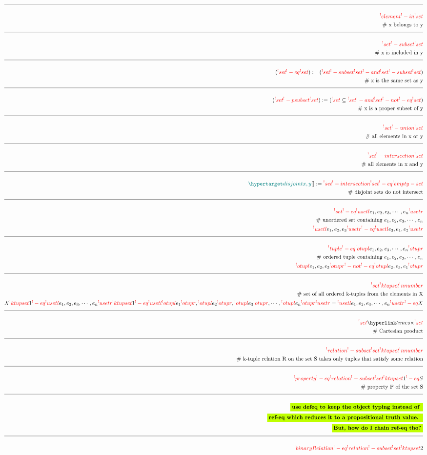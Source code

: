 \documentclass[a4paper]{article}
\newcommand{\tdb}[1]{\colorbox{lime}{$\displaystyle #1$}}
\newcommand{\defeq}{:=}
\newcommand{\enlist}[2]{{#1}_{1}, {#1}_{2}, {#1}_{3}, \cdots, {#1}_{#2}}
\newcommand{\eqComment}[1]{\text{  \# #1}}
\newcommand{\n}{\\[1.5ex] \hline \nonumber \\[0ex]}
\newcommand{\m}{\nonumber \\}
\begin{document}
\begin{tcolorbox}
\begin{align}
\n \rfr{element} [x][] \rfr{-in} \rfr{set} [y][] %
\m \eqComment{x belongs to y}
\n \rfr{set} [x][] \rfr{-subset} \rfr{set} [y][]
\m \eqComment{x is included in y}
\n (\rfr{set} [x][] \rfr{-eq} \rfr{set} [y][]) \defeq (\rfr{set} [x][] \rfr{-subset} \rfr{set} [y][] \rfr{-and} \rfr{set} [y][] \rfr{-subset} \rfr{set} [x][])
\m \eqComment{x is the same set as y}
\n (\rfr{set} [x][] \rfr{-psubset} \rfr{set} [y][]) \defeq (\rfr{set} [x][] \subseteq \rfr{set} [y][] \rfr{-and} \rfr{set} [x][] \rfr{-not} \rfr{-eq} \rfr{set} [y][])
\m \eqComment{x is a proper subset of y}
\n \rfr{set} [x][] \rfr{-union} \rfr{set} [y][]
\m \eqComment{all elements in x or y}
\n \rfr{set} [x][] \rfr{-intersection} \rfr{set} [y][]
\m \eqComment{all elements in x and y}
\n \dfn{disjoint} [x, y][] \defeq \rfr{set} [x][] \rfr{-intersection} \rfr{set} [y][] \rfr{-eq} \rfr{empty-set}
\m \eqComment{disjoint sets do not intersect}
\n \rfr{set} [E][] \rfr{-eq} \rfr{usetl} \enlist{e}{n} \rfr{usetr}
\m \eqComment{unordered set containing $\enlist{e}{n}$}
\m \rfr{usetl} e_1, e_2, e_3 \rfr{usetr} \rfr{-eq} \rfr{usetl} e_3, e_1, e_2 \rfr{usetr}
\n \rfr{tuple} [E][] \rfr{-eq} \rfr{otupl} \enlist{e}{n} \rfr{otupr} 
\m \eqComment{ordered tuple containing $\enlist{e}{n}$}
\m \rfr{otupl} e_1, e_2, e_3 \rfr{otupr} \rfr{-not} \rfr{-eq} \rfr{otupl} e_2, e_3, e_1 \rfr{otupr}
\n \rfr{set} [X][] \rfr{ktupset} \rfr{nnumber} [k][]
\m \eqComment{set of all ordered k-tuples from the elements in X}
\m X \rfr{ktupset} 1 \rfr{-eq} \rfr{usetl} \enlist{e}{n} \rfr{usetr} \rfr{ktupset} 1 \rfr{-eq} \rfr{usetl} \rfr{otupl} e_1 \rfr{otupr}, \rfr{otupl} e_2 \rfr{otupr}, \rfr{otupl} e_3 \rfr{otupr}, \cdots, \rfr{otupl} e_n \rfr{otupr} \rfr{usetr} = \rfr{usetl} \enlist{e}{n} \rfr{usetr} \rfr{-eq} X
\n \rfr{set} [Y][] \rfr{times} \rfr{set} [Z][]
\m \eqComment{Cartesian product}
\n \rfr{relation} [R][S, k] \rfr{-subset} \rfr{set} [S][] \rfr{ktupset} \rfr{nnumber} [k][]
\m \eqComment{k-tuple relation R on the set S takes only tuples that satisfy some relation}
\n \rfr{property} [P][S] \rfr{-eq} \rfr{relation} [P][S, 1] \rfr{-subset} \rfr{set} [S][] \rfr{ktupset} 1 \rfr{-eq} S
\m \eqComment{property P of the set S}
\n \tdb{\textbf{use defeq to keep the object typing instead of }}
\m \tdb{\textbf{ref-eq which reduces it to a propositional truth value. }}
\m \tdb{\textbf{But, how do I chain ref-eq tho?}}
\n \rfr{binaryRelation} [B][S] \rfr{-eq} \rfr{relation} [B][S, 2] \rfr{-subset} \rfr{set} [S][] \rfr{ktupset} 2

\end{align}
\end{tcolorbox}
\end{document}
